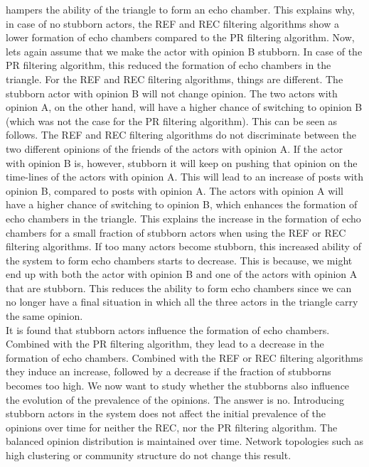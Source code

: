 \documentclass[11 pt , letterpaper , twoside , openright]{book}
\begin{document}
hampers the ability of the triangle to form an echo chamber. This explains why, in case of no stubborn actors, the REF and REC filtering algorithms show a lower formation of echo chambers compared to the PR filtering algorithm. Now, lets again assume that we make the actor with opinion B stubborn. In case of the PR filtering algorithm, this reduced the formation of echo chambers in the triangle. For the REF and REC filtering algorithms, things are different. The stubborn actor with opinion B will not change opinion. The two actors with opinion A, on the other hand, will have a higher chance of switching to opinion B (which was not the case for the PR filtering algorithm). This can be seen as follows. The REF and REC filtering algorithms do not discriminate between the two different opinions of the friends of the actors with opinion A. If the actor with opinion B is, however, stubborn it will keep on pushing that opinion on the time-lines of the actors with opinion A. This will lead to an increase of posts with opinion B, compared to posts with opinion A. The actors with opinion A will have a higher chance of switching to opinion B, which enhances the formation of echo chambers in the triangle. This explains the increase in the formation of echo chambers for a small fraction of stubborn actors when using the REF or REC filtering algorithms. If too many actors become stubborn, this increased ability of the system to form echo chambers starts to decrease. This is because, we might end up with both the actor with opinion B and one of the actors with opinion A that are stubborn. This reduces the ability to form echo chambers since we can no longer have a final situation in which all the three actors in the triangle carry the same opinion.\\
\newline
It is found that stubborn actors influence the formation of echo chambers. Combined with the PR filtering algorithm, they lead to a decrease in the formation of echo chambers. Combined with the REF or REC filtering algorithms they induce an increase, followed by a decrease if the fraction of stubborns becomes too high. We now want to study whether the stubborns also influence the evolution of the prevalence of the opinions. The answer is no. Introducing stubborn actors in the system does not affect the initial prevalence of the opinions over time for neither the REC, nor the PR filtering algorithm. The balanced opinion distribution is maintained over time. Network topologies such as high clustering or community structure do not change this result. \\
\end{document}
